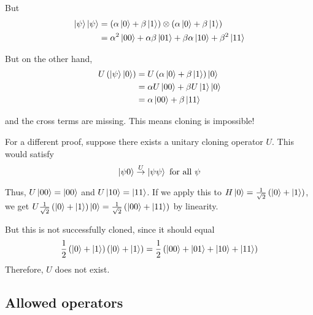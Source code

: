 \documentclass[12pt, english]{book}
\begin{document}
But 
\begin{align*}
	\ket{\psi} \ket{\psi} &= \left( \alpha \ket{0} + \beta \ket{1} \right) \otimes \left( \alpha \ket{0} + \beta \ket{1} \right) \\
	&= \alpha^2 \ket{00} + \alpha \beta \ket{01} + \beta \alpha \ket{10} + \beta^2 \ket{11}
\end{align*}

But on the other hand, 
\begin{align*}
	U \left( \ket{\psi} \ket{0} \right) &= U \left( \alpha \ket{0} + \beta \ket{1} \right) \ket{0} \\ 
	&= \alpha U \ket{00} + \beta U \ket{1} \ket{0} \\
	&= \alpha \ket{00} + \beta \ket{11}
\end{align*}

and the cross terms are missing.
This means cloning is impossible! 

For a different proof, suppose there exists a unitary cloning operator $U$.
This would satisfy 
\[ \ket{\psi 0} \stackrel{U}{\rightarrow} \ket{\psi \psi}\ \text{for all}\ \psi \]

Thus, $U \ket{00} = \ket{00}$ and $U\ket{10} = \ket{11}$.
If we apply this to $H \ket{0} = \frac{1}{\sqrt{2}} \left( \ket{0} + \ket{1} \right)$, we get $U \frac{1}{\sqrt{2}} \left( \ket{0} + \ket{1} \right) \ket{0} = \frac{1}{\sqrt{2}} \left( \ket{00} + \ket{11} \right)$ by linearity.

But this is not successfully cloned, since it should equal
\[ \frac{1}{2} \left( \ket{0} + \ket{1} \right) \left( \ket{0} + \ket{1} \right) = \frac{1}{2} \left( \ket{00} + \ket{01} + \ket{10} + \ket{11} \right) \]
Therefore, $U$ does not exist.


\subsection{Allowed operators}
\end{document}
